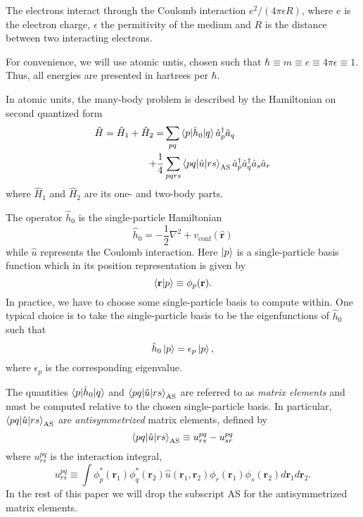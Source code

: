 \documentclass[a4paper,10pt, twocolumn]{article}
\begin{document}
The electrons interact through the Coulomb interaction $e^2/(4\pi \epsilon R)$, where $e$ is the electron charge, $\epsilon$ the permitivity of the medium and $R$ is the 
distance between two interacting electrons.

For convenience, we will use atomic untis, chosen such that $\hbar \equiv m \equiv e \equiv 4\pi \epsilon \equiv 1$. Thus, all energies are presented in hartrees per $\hbar$.

In atomic units, the many-body problem is described by the Hamiltonian on second quantized form
\begin{align}
 \hat{H} = \hat{H}_1 + \hat{H}_2 = &\sum_{pq} \braket{p|\hat{h}_0|q}\hat{a}_p^\dagger\hat{a}_q \nonumber \\
 + \frac{1}{4}&\sum_{pqrs}\braket{pq|\hat{u}|rs}_{\text{AS}}\hat{a}_p^\dagger\hat{a}_q^\dagger\hat{a}_s\hat{a}_r \label{FieldFreeHamiltonian}
\end{align}
where $\hat{H}_1$ and $\hat{H}_2$ are its one- and two-body parts. 

The operator $\hat{h}_0$ is the single-particle Hamiltonian
\begin{equation}
 \hat{h}_0 = -\frac{1}{2}\nabla^2 + v_{\text{conf}}(\mathbf{\hat{r}})
\end{equation}
while $\hat{u}$ represents the Coulomb interaction. Here $\ket{p}$ is a single-particle basis function which in its position representation is given by
\begin{equation}
 \braket{\mathbf{r}|p} \equiv \phi_p(\mathbf{r}).
\end{equation}
In practice, we have to choose some single-particle basis to compute within. One typical choice is to take the single-particle basis to be the eigenfunctions of $\hat{h}_0$ such that 
\begin{equation}
 \hat{h}_0 \ket{p} = \epsilon_p \ket{p},
\end{equation}
where $\epsilon_p$ is the corresponding eigenvalue.

The quantities $\braket{p|\hat{h}_0|q}$ and $\braket{pq|\hat{u}|rs}_{\text{AS}}$ are referred to as \textit{matrix elements} and must 
be computed relative to the chosen single-particle basis. In particular, $\braket{pq|\hat{u}|rs}_{\text{AS}}$ are \textit{antisymmetrized} matrix elements, defined  by 
\begin{equation}
 \braket{pq|\hat{u}|rs}_{\text{AS}} \equiv u^{pq}_{rs} - u^{pq}_{sr}
\end{equation}
where $u^{pq}_{rs}$ is the interaction integral, 
\begin{equation}
 u^{pq}_{rs} \equiv \int \phi^*_p(\mathbf{r}_1) \phi^*_q(\mathbf{r}_2) \hat{u}(\mathbf{r}_1,\mathbf{r}_2) \phi_r(\mathbf{r}_1)\phi_s(\mathbf{r}_2) d\mathbf{r}_1 d\mathbf{r}_2.
\end{equation}
In the rest of this paper we will drop the subscript AS for the antisymmetrized matrix elements. 
\end{document}
